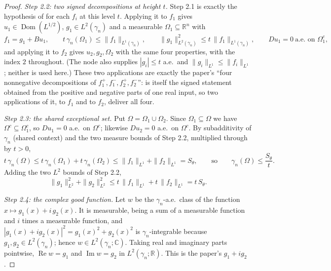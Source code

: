 \begin{proof}
\emph{Step 2.2: two signed decompositions at height $t$.}
Step 2.1 is exactly the hypothesis of  for each
$f_i$ at this level $t$.  Applying it to $f_1$ gives
$u_1 \in \operatorname{Dom}(L^{1/2})$, $g_1 \in L^2(\gamma_n)$ and a measurable
$\Omega_1 \subseteq \mathbb{R}^n$ with
\[
  f_1 = g_1 + Bu_1, \qquad
  t\,\gamma_n(\Omega_1) \leq \|f_1\|_{L^1(\gamma_n)}, \qquad
  \|g_1\|_{L^2(\gamma_n)}^2 \leq t\,\|f_1\|_{L^1(\gamma_n)}, \qquad
  Du_1 = 0 \ \text{a.e. on } \Omega_1^c ,
\]
and applying it to $f_2$ gives $u_2, g_2, \Omega_2$ with the same four
properties, with the index $2$ throughout.  (The node also supplies
$|g_i| \leq t$ a.e.\ and $\|g_i\|_{L^1} \leq \|f_i\|_{L^1}$; neither is used
here.)  These two applications are exactly the paper's ``four nonnegative
decompositions of $f_1^+, f_1^-, f_2^+, f_2^-$'': 
is itself the signed statement obtained from the positive and negative parts of
one real input, so two applications of it, to $f_1$ and to $f_2$, deliver all
four.

\emph{Step 2.3: the shared exceptional set.}
Put $\Omega = \Omega_1 \cup \Omega_2$.  Since $\Omega_1 \subseteq \Omega$ we have
$\Omega^c \subseteq \Omega_1^c$, so $Du_1 = 0$ a.e.\ on $\Omega^c$; likewise
$Du_2 = 0$ a.e.\ on $\Omega^c$.  By subadditivity of $\gamma_n$ (shared
context) and the two measure bounds of Step 2.2, multiplied through by $t > 0$,
\begin{equation*}
  t\,\gamma_n(\Omega) \leq t\,\gamma_n(\Omega_1) + t\,\gamma_n(\Omega_2)
    \leq \|f_1\|_{L^1} + \|f_2\|_{L^1} = S_\theta ,
  \qquad\text{so}\qquad
  \gamma_n(\Omega) \leq \frac{S_\theta}{t} . \tag{1}
\end{equation*}
Adding the two $L^2$ bounds of Step 2.2,
\begin{equation*}
  \|g_1\|_{L^2}^2 + \|g_2\|_{L^2}^2
    \leq t\,\|f_1\|_{L^1} + t\,\|f_2\|_{L^1} = t\,S_\theta . \tag{2}
\end{equation*}

\emph{Step 2.4: the complex good function.}
Let $w$ be the $\gamma_n$-a.e.\ class of the function
$x \mapsto g_1(x) + i\,g_2(x)$.  It is measurable, being a sum of a measurable
function and $i$ times a measurable function, and
$|g_1(x) + ig_2(x)|^2 = g_1(x)^2 + g_2(x)^2$ is $\gamma_n$-integrable because
$g_1, g_2 \in L^2(\gamma_n)$; hence $w \in L^2(\gamma_n;\mathbb{C})$.  Taking
real and imaginary parts pointwise, $\operatorname{Re} w = g_1$ and
$\operatorname{Im} w = g_2$ in $L^2(\gamma_n;\mathbb{R})$.  This is the paper's
$g_1 + ig_2$.


\end{proof}
